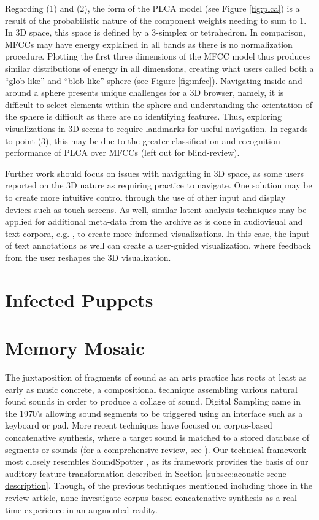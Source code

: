 \documentclass[a4paper,10pt,final]{ThesisStyle}
\begin{document}
Regarding (1) and (2), the form of the PLCA model (see Figure \ref{fig:plca}) is a result of the probabilistic nature of the component weights needing to sum to 1.  In 3D space, this space is defined by a 3-simplex or tetrahedron.  In comparison, MFCCs may have energy explained in all bands as there is no normalization procedure.  Plotting the first three dimensions of the MFCC model thus produces similar distributions of energy in all dimensions, creating what users called both a ``glob like'' and ``blob like'' sphere (see Figure \ref{fig:mfcc}).    Navigating inside and around a sphere presents unique challenges for a 3D browser, namely, it is difficult to select elements within the sphere and understanding the orientation of the sphere is difficult as there are no identifying features.  Thus, exploring visualizations in 3D seems to require landmarks for useful navigation.  In regards to point (3), this may be due to the greater classification and recognition performance of PLCA over MFCCs (left out for blind-review).  

Further work should focus on issues with navigating in 3D space, as some users reported on the 3D nature as requiring practice to navigate.  One solution may be to create more intuitive control through the use of other input and display devices such as touch-screens.  As well, similar latent-analysis techniques may be applied for additional meta-data from the archive as is done in audiovisual and text corpora, e.g. \cite{Himmel1998,Christel1998}, to create more informed visualizations.  In this case, the input of text annotations as well can create a user-guided visualization, where feedback from the user reshapes the 3D visualization. 



\section{Infected Puppets}


\section{Memory Mosaic}


The juxtaposition of fragments of sound as an arts practice has roots at least as early as music concrete, a compositional technique assembling various natural found sounds in order to produce a collage of sound.  Digital Sampling came in the 1970's allowing sound segments to be triggered using an interface such as a keyboard or pad.  More recent techniques have focused on corpus-based concatenative synthesis, where a target sound is matched to a stored database of segments or sounds (for a comprehensive review, see \cite{Schwarz2006}).  Our technical framework most closely resembles SoundSpotter \cite{CaseyICMC2007}, as its framework provides the basis of our auditory feature transformation described in Section \ref{subsec:acoustic-scene-description}.  Though, of the previous techniques mentioned including those in the review article, none investigate corpus-based concatenative synthesis as a real-time experience in an augmented reality.
\end{document}
